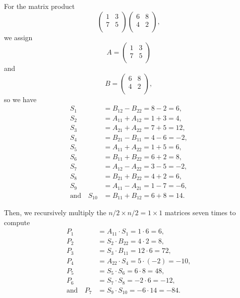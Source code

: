 For the matrix product
\[
  \begin{pmatrix}
    1 & 3 \\
    7 & 5 \\
  \end{pmatrix}
  \begin{pmatrix}
    6 & 8 \\
    4 & 2 \\
  \end{pmatrix},
\]
we assign
\[
  A =
  \begin{pmatrix}
    1 & 3 \\
    7 & 5 \\
  \end{pmatrix}
\]
and
\[
  B =
  \begin{pmatrix}
    6 & 8 \\
    4 & 2 \\
  \end{pmatrix},
\]
so we have
\begin{equation*}
  \begin{split}
    S_1 &= B_{12} - B_{22} = 8 - 2 = 6, \\
    S_2 &= A_{11} + A_{12} = 1 + 3 = 4, \\
    S_3 &= A_{21} + A_{22} = 7 + 5 = 12, \\
    S_4 &= B_{21} - B_{11} = 4 - 6 = -2, \\
    S_5 &= A_{11} + A_{22} = 1 + 5 = 6, \\
    S_6 &= B_{11} + B_{22} = 6 + 2 = 8, \\
    S_7 &= A_{12} - A_{22} = 3 - 5 = -2, \\
    S_8 &= B_{21} + B_{22} = 4 + 2 = 6, \\
    S_9 &= A_{11} - A_{21} = 1 - 7 = -6, \\
    \text{and} \quad S_{10} &= B_{11} + B_{12} = 6 + 8 = 14.
  \end{split}
\end{equation*}

Then, we recursively multiply the $n/2 \times n/2 = 1 \times 1$
matrices seven times
to compute
\begin{equation*}
  \begin{split}
    P_1 &= A_{11} \cdot S_1 = 1 \cdot 6 = 6, \\
    P_2 &= S_2 \cdot B_{22} = 4 \cdot 2 = 8, \\
    P_3 &= S_3 \cdot B_{11} = 12 \cdot 6 = 72, \\
    P_4 &= A_{22} \cdot S_4 = 5 \cdot (-2) = - 10, \\
    P_5 &= S_5 \cdot S_6 = 6 \cdot 8 = 48, \\
    P_6 &= S_7 \cdot S_8 = -2 \cdot 6 = -12, \\
    \text{and} \quad P_7 &= S_9 \cdot S_{10} = -6 \cdot 14 = -84.
  \end{split}
\end{equation*}

